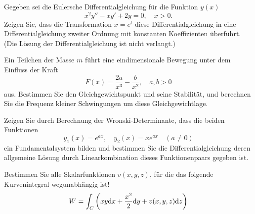 \begin{atiTask}[
	title = Weitere Fragen
]
\begin{atiSubtasks}
	\item Gegeben sei die Eulersche Differentialgleichung für die Funktion $y(x)$
	\begin{equation*}
	x^2y''-xy'+2y=0,\quad x>0.
	\end{equation*}
	Zeigen Sie, dass die Transformation $x=e^t$ diese Differentialgleichung in eine Differentialgleichung zweiter Ordnung mit konstanten Koeffizienten überführt. (Die Lösung der Differentialgleichung ist nicht verlangt.)
	\item Ein Teilchen der Masse $m$ führt eine eindimensionale Bewegung unter dem Einfluss der Kraft
	\begin{equation*}
	F(x)=\frac{2a}{x^3}-\frac{b}{x^2},\quad a,b>0
	\end{equation*}
	aus.
	Bestimmen Sie den Gleichgewichtspunkt und seine Stabilität, und berechnen Sie die Frequenz kleiner Schwingungen um diese Gleichgewichtlage.
	\item Zeigen Sie durch Berechnung der Wronski-Determinante, dass die beiden Funktionen
	\begin{equation*}
	y_1(x)=e^{ax},\quad y_2(x)=xe^{ax}\quad (a\neq 0)
	\end{equation*}
	ein Fundamentalsystem bilden und bestimmen Sie die Differentialgleichung deren allgemeine Lösung durch Linearkombination dieses Funktionenpaars gegeben ist.
	\item Bestimmen Sie alle Skalarfunktionen $v(x,y,z)$, für die das folgende Kurvenintegral wegunabhängig ist!
	\begin{equation*}
	W=\int_C \left(xy\D x+\frac{x^2}{2}\D y+v(x,y,z)\D z\right) %
	\end{equation*}
	\end{atiSubtasks}
\end{atiTask}
